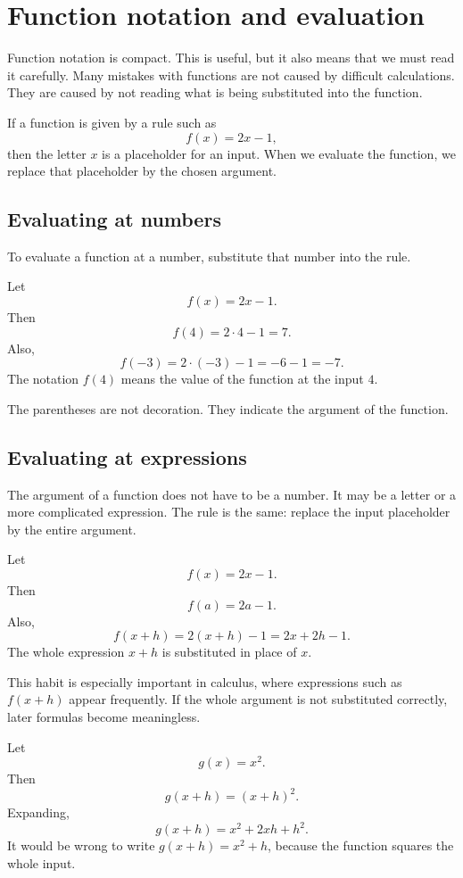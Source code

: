 \section{Function notation and evaluation}

Function notation is compact. This is useful, but it also means that we must read it carefully. Many mistakes with functions are not caused by difficult calculations. They are caused by not reading what is being substituted into the function.

If a function is given by a rule such as
\[
f(x)=2x-1,
\]
then the letter \(x\) is a placeholder for an input. When we evaluate the function, we replace that placeholder by the chosen argument.

\subsection*{Evaluating at numbers}

To evaluate a function at a number, substitute that number into the rule.

\begin{examplebox}
Let
\[
f(x)=2x-1.
\]
Then
\[
f(4)=2\cdot4-1=7.
\]
Also,
\[
f(-3)=2\cdot(-3)-1=-6-1=-7.
\]
The notation \(f(4)\) means the value of the function at the input \(4\).
\end{examplebox}

The parentheses are not decoration. They indicate the argument of the function.

\subsection*{Evaluating at expressions}

The argument of a function does not have to be a number. It may be a letter or a more complicated expression. The rule is the same: replace the input placeholder by the entire argument.

\begin{examplebox}
Let
\[
f(x)=2x-1.
\]
Then
\[
f(a)=2a-1.
\]
Also,
\[
f(x+h)=2(x+h)-1=2x+2h-1.
\]
The whole expression \(x+h\) is substituted in place of \(x\).
\end{examplebox}

This habit is especially important in calculus, where expressions such as \(f(x+h)\) appear frequently. If the whole argument is not substituted correctly, later formulas become meaningless.

\begin{examplebox}
Let
\[
g(x)=x^2.
\]
Then
\[
g(x+h)=(x+h)^2.
\]
Expanding,
\[
g(x+h)=x^2+2xh+h^2.
\]
It would be wrong to write \(g(x+h)=x^2+h\), because the function squares the whole input.
\end{examplebox}

